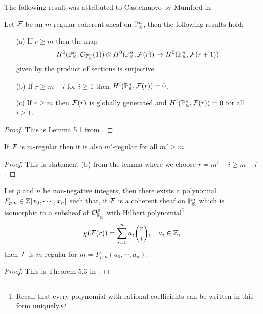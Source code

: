 The following result was attributed to Castelnuovo by Mumford in \cite{mumford1966lectures}
\begin{lemma}[Castelnuovo]\label{CastelnuovoLemma}
Let $\mathcal{F}$ be an $m$-regular coherent sheaf on $\mathbb{P}^n_{\mathbb{K}}$, then the following results hold:
\begin{enumerate}
\item[\rm(a)] If $r\geq m$ then the map
\[H^0(\mathbb{P}^n_{\mathbb{K}},\mathcal{O}_{\mathbb{P}^n_{\mathbb{K}}}(1))\otimes H^0(\mathbb{P}^n_{\mathbb{K}},\mathcal{F}(r))\to H^0(\mathbb{P}^n_{\mathbb{K}},\mathcal{F}(r+1))\]
given by the product of sections is surjective.
\item[\rm(b)] If $r\geq m-i$ for $i\geq 1$ then $H^i(\mathbb{P}^n_{\mathbb{K}},\mathcal{F}(r))=0$.
\item[\rm(c)] If $r\geq m$ then $\mathcal{F}(r)$ is globally generated and $H^i(\mathbb{P}^n_{\mathbb{K}},\mathcal{F}(r))=0$ for all $i\geq 1$.
\end{enumerate}
\end{lemma}
\begin{proof}
This is Lemma 5.1 from \cite{FGAEXPLAINED}.
\end{proof}

\begin{corollary}\label{RegularityUnboundedAbove}
If $\mathcal{F}$ is $m$-regular then it is also $m'$-regular for all $m'\geq m$.
\end{corollary}
\begin{proof}
This is statement (b) from the lemma where we choose $r=m'-i\geq m-i$.
\end{proof}

\begin{theorem}[Mumford]\label{MumfordTheorem}
Let $p$ and $n$ be non-negative integers, then there exists a polynomial $F_{p,n}\in\mathbb{Z}[x_0,\cdots, x_n]$ such that, if $\mathcal{F}$ is a coherent sheaf on $\mathbb{P}^n_{\mathbb{K}}$ which is isomorphic to a subsheaf of $\mathcal{O}^p_{\mathbb{P}^n_{\mathbb{K}}}$ with Hilbert polynomial\footnote{Recall that every polynomial with rational coefficients can be written in this form uniquely.}
\[\chi(\mathcal{F}(r))=\sum_{i=0}^na_i\binom ri,\quad a_i\in\mathbb{Z},\]
then $\mathcal{F}$ is $m$-regular for $m=F_{p,n}(a_0,\cdots, a_n)$.
\end{theorem}
\begin{proof}
This is Theorem 5.3 in \cite{FGAEXPLAINED}.
\end{proof}


